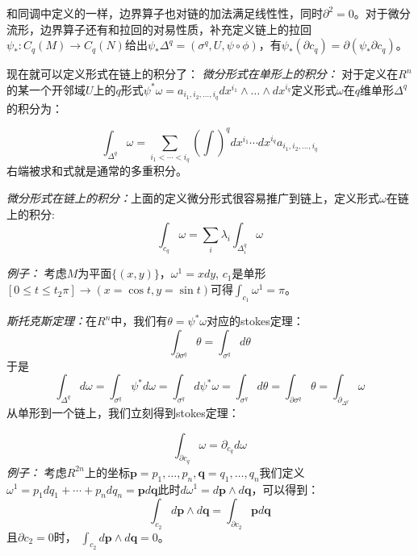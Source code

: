 \documentclass[supercite]{HustGraduPaper}
\begin{document}
\begin{appendices}
		和同调中定义的一样，边界算子也对链的加法满足线性性，同时$\partial^2 = 0$。对于微分流形，边界算子还有和拉回的对易性质，补充定义链上的拉回$\psi_*: C_q(M) \to C_q(N)$给出$\psi_* \Delta^q = (\sigma^q,U,\psi \circ \phi) $，有$\psi_*(\partial c_q) = \partial (\psi_* \partial c_q)$。
		
		现在就可以定义形式在链上的积分了：
		\textit{微分形式在单形上的积分：} 对于定义在$R^n$的某一个开邻域$U$上的$q$形式$\psi^* \omega = a_{i_1,i_2,\ldots, i_q} dx^{i_1} \wedge \ldots \wedge dx^{i_q}$定义形式$\omega$在$q$维单形$\Delta^q$的积分为：
		
		\begin{equation}
		\int_{\Delta^q} \omega = \sum_{i_1< \cdots<i_q} (\int)^q dx^{i_1} \cdots dx^{i_q}  a_{i_1,i_2,\ldots, i_q}
		\end{equation}
		右端被求和式就是通常的多重积分。
		
		\textit{微分形式在链上的积分：}上面的定义微分形式很容易推广到链上，定义形式$\omega$在链上的积分:
		\begin{equation}
		\int_{c_q} \omega = \sum_i \lambda_i \int_{\Delta_i^q} \omega
		\end{equation}
		
		\textit{例子：} 考虑$M$为平面$\{(x,y)\}$，$\omega^1 = xdy$, $c_1$是单形$[0 \le t \le t_2\pi] \to (x = \cos t, y = \sin t)$可得$\int_{c_1} \omega^1 = \pi$。
		
		
		
		\textit{斯托克斯定理：}在$R^n$中，我们有$\theta= \psi^* \omega$对应的stokes定理：
		\begin{equation}
		\int_{\partial \sigma^q} \theta = \int_{\sigma^q} d\theta
		\end{equation}
		于是
		\begin{equation}
		\int_{\Delta^q} d\omega = \int_{\sigma^q} \psi^* d\omega = \int_{\sigma^q} d \psi^* \omega = \int_{\sigma^q} d\theta = \int_{\partial \sigma^q} \theta = \int _{\partial_{\Delta^q}} \omega 
		\end{equation}
		从单形到一个链上，我们立刻得到stokes定理：
		
		\begin{equation}
		\int_{\partial c_q} \omega = \partial_{c_q} d\omega
		\end{equation}
		\textit{例子：} 考虑$R^{2n}$上的坐标$\mathbf{p} = p_1,\ldots,p_n, \mathbf{q} = q_1,\ldots,q_n$我们定义$\omega^1 = p_1 dq_1 + \cdots + p_n dq_n =\mathbf{p} d \mathbf{q}$此时$d\omega^1  = d\mathbf{p} \wedge d\mathbf{q}$，可以得到：
		\begin{equation}
		\int_{c_2} d\mathbf{p} \wedge d\mathbf{q} = \int_{\partial c_2} \mathbf{p} d\mathbf{q}
		\end{equation}
		且$\partial c_2 = 0$时， $\int_{c_2} d\mathbf{p} \wedge d\mathbf{q} = 0$。
		

\end{appendices}
\end{document}
